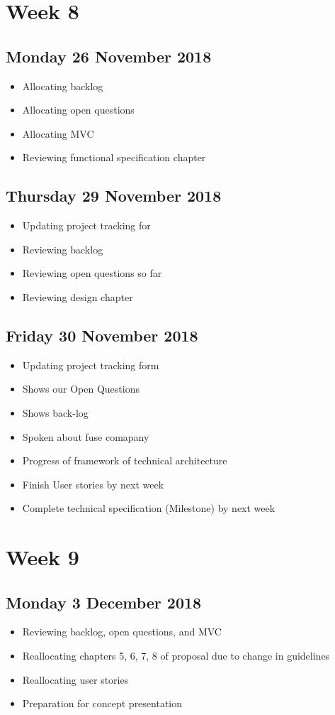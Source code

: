 \section*{Week 8}
\subsection*{Monday 26 November 2018}
\begin{itemize}
	\item Allocating backlog
	\item Allocating open questions
	\item Allocating MVC
	\item Reviewing functional specification chapter
\end{itemize}

\subsection*{Thursday 29 November 2018}
\begin{itemize}
	\item Updating project tracking for
	\item Reviewing backlog
	\item Reviewing open questions so far
	\item Reviewing design chapter
\end{itemize}

\subsection*{Friday 30 November 2018}
\begin{itemize}
	\item Updating project tracking form
	\item Shows our Open Questions
	\item Shows back-log
	\item Spoken about fuse comapany
	\item Progress of framework of technical architecture
	\item Finish User stories by next week
	\item Complete technical specification (Milestone) by next week
\end{itemize}

\section*{Week 9}
\subsection*{Monday 3 December 2018}
\begin{itemize}
	\item Reviewing backlog, open questions, and MVC
	\item Reallocating chapters 5, 6, 7, 8 of proposal due to change in guidelines
	\item Reallocating user stories
	\item Preparation for concept presentation
\end{itemize}

